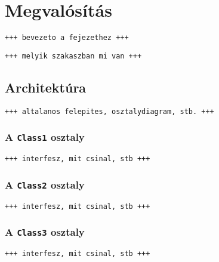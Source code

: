 \chapter{Megvalósítás}\label{sect:megvalositas}

\texttt{+++ bevezeto a fejezethez +++}

\bigskip

\texttt{+++ melyik szakaszban mi van +++}

\section{Architektúra}\label{sect:architektura}

\texttt{+++ altalanos felepites, osztalydiagram, stb. +++}

\subsection{A \texttt{Class1} osztaly}\label{sect:class1}

\texttt{+++ interfesz, mit csinal, stb +++}

\subsection{A \texttt{Class2} osztaly}\label{sect:class2}

\texttt{+++ interfesz, mit csinal, stb +++}

\subsection{A \texttt{Class3} osztaly}\label{sect:class3}

\texttt{+++ interfesz, mit csinal, stb +++}

